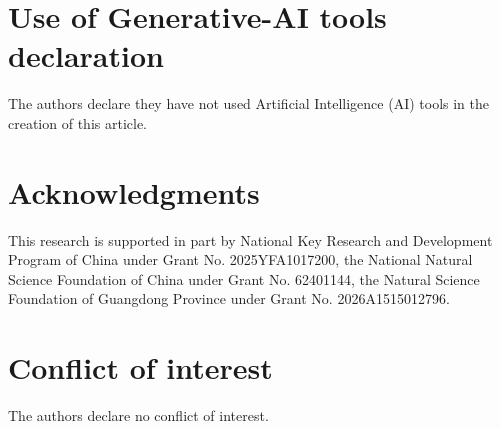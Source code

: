 \documentclass{aims}
\numberwithin{equation}{section}
\theoremstyle{definition}
\begin{document}



\section*{Use of Generative-AI tools declaration}
The authors declare they have not used Artificial Intelligence (AI) tools in the creation of this article.

\section*{Acknowledgments}
This research is supported in part by National Key Research and Development Program of China under Grant No.
2025YFA1017200, the National Natural Science Foundation of China under Grant No. 62401144, the Natural Science Foundation
of Guangdong Province under Grant No. 2026A1515012796.

\section*{Conflict of interest}
The authors declare no conflict of interest.
\end{document}
